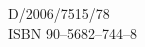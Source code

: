 \begin{flushleft}
D/2006/7515/78\\
ISBN 90--5682--744--8\\
\end{flushleft}


\pagestyle{empty}
\newpage




